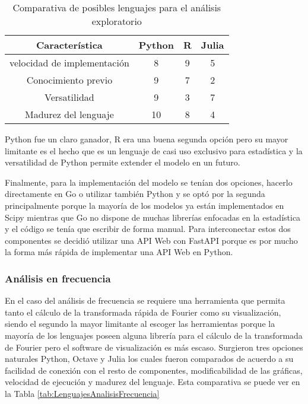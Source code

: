     \begin{table}[ht]
        \caption[Comparativa de posibles lenguajes para el análisis exploratorio]{Comparativa de posibles lenguajes para el análisis exploratorio}
        \label{tab:LenguajesAnalisisExploratorio}
        \begin{center}
            \vspace{0.3cm}
            \begin{tabular}{|c|c|c|c|}
                \hline
                Característica              & Python & R & Julia\\\hline
                \hline
                velocidad de implementación & 8     & 9     & 5 \\\hline
                Conocimiento previo         & 9     & 7     & 2 \\\hline
                Versatilidad              & 9     & 3     & 7 \\\hline
                Madurez del lenguaje        & 10    & 8     & 4 \\\hline
            \end{tabular}
        \end{center}
    \end{table}

    Python fue un claro ganador, R era una buena segunda opción pero su mayor
    limitante es el hecho que es un lenguaje de casi uso exclusivo para
    estadística y la versatilidad de Python  permite extender el modelo en un
    futuro.

    Finalmente, para la implementación del modelo se tenían dos opciones,
    hacerlo directamente en Go o utilizar también Python y se optó por la
    segunda principalmente porque la mayoría de los modelos ya están
    implementados en Scipy mientras que Go no dispone de muchas librerías
    enfocadas en la estadística y el código se tenía que escribir de forma
    manual. Para interconectar estos dos componentes se decidió utilizar una
    API Web con FastAPI porque es por mucho la forma más rápida de implementar
    una API Web en Python.

    \subsubsection{Análisis en frecuencia}
    En el caso del análisis de frecuencia se requiere una herramienta que
    permita tanto el cálculo de la transformada rápida de Fourier como su
    visualización, siendo el segundo la mayor limitante al escoger
    las herramientas porque la mayoría de los lenguajes poseen alguna librería
    para el cálculo de la transformada de Fourier pero el software de
    visualización es más escaso. Surgieron tres opciones naturales Python,
    Octave y Julia los cuales fueron comparados de acuerdo a su facilidad de
    conexión con el resto de componentes, modificabilidad de las gráficas,
    velocidad de ejecución y madurez del lenguaje. Esta comparativa se puede
    ver en la Tabla \ref{tab:LenguajesAnalisisFrecuencia}

